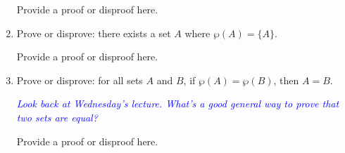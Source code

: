 \documentclass{article}
\renewcommand{\(}{\left(}
\renewcommand{\)}{\right)}
\theoremstyle{plain}
\theoremstyle{plain}
\theoremstyle{definition}
\begin{document}
\begin{enumerate}[label*=\roman*.,ref=\roman*]
\begin{shaded}
Provide a proof or disproof here.
\end{shaded}

\item Prove or disprove: there exists a set $A$ where $\wp(A) = \{A\}$.

\begin{shaded}
Provide a proof or disproof here.
\end{shaded}

\item Prove or disprove: for all sets $A$ and $B$,
if $\wp(A) = \wp(B)$, then $A = B$.

\textit{\textcolor{blue}{ Look back at Wednesday's lecture. What's a good general way to prove that two sets are equal? }}

\begin{shaded}
Provide a proof or disproof here.
\end{shaded}

\end{enumerate}
\end{document}
